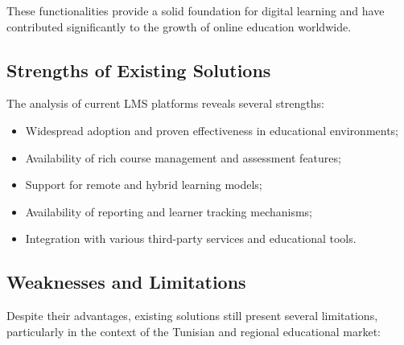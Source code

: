 These functionalities provide a solid foundation for digital learning and have contributed
significantly to the growth of online education worldwide.

\subsection{Strengths of Existing Solutions}

The analysis of current LMS platforms reveals several strengths:

\begin{itemize}
  \item Widespread adoption and proven effectiveness in educational environments;
  \item Availability of rich course management and assessment features;
  \item Support for remote and hybrid learning models;
  \item Availability of reporting and learner tracking mechanisms;
  \item Integration with various third-party services and educational tools.
\end{itemize}

\subsection{Weaknesses and Limitations}

Despite their advantages, existing solutions still present several limitations, particularly
in the context of the Tunisian and regional educational market:

